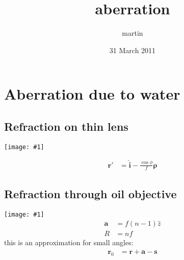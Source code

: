 \documentclass[twocolumn,DIV19]{scrartcl}
\title{aberration}
\author{martin}
\date{31 March 2011}
\begin{document}
\maketitle

\setcounter{tocdepth}{3}
\tableofcontents
\vspace*{1cm}

\newcommand{\vect}[1]{\mathbf{#1}}
\renewcommand{\r}{\vect r}
\renewcommand{\a}{\vect a}
\newcommand{\s}{\vect s}
\renewcommand{\k}{\vect k}

\newcommand{\nvect}[1]{\vect{\hat{#1}}}
\renewcommand{\i}{\nvect i}
\newcommand{\n}{\nvect n}
\renewcommand{\t}{\nvect t}
\newcommand{\m}{\nvect m}
\newcommand{\vrho}{\vect\rho}
\newcommand{\bild}[1]{\texttt{[image: \#1]}}
\section{Aberration due to water}
\subsection{Refraction on thin lens}
\bild{thin-lens.jpg}

\begin{align}
  \r'&=\i- \frac{\cos\phi}{f} \vrho
\end{align}
\subsection{Refraction through oil objective}
\bild{objective.jpg}
\begin{align}
  \a &= f (n-1) \hat z \\
  R &= nf
\end{align}
this is an approximation for small angles: 
\begin{align}
  \r_0 &= \r + \a - \s
\end{align}
\end{document}
